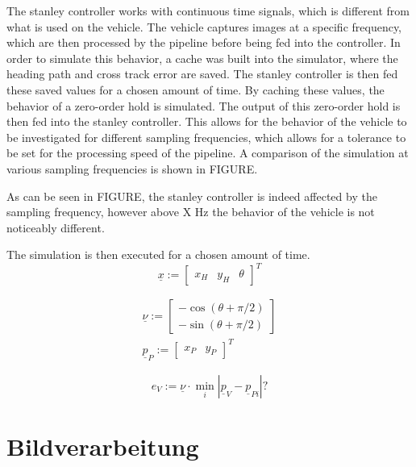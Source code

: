 \documentclass[arbeit=studie,oneside,BCOR=12mm]{ArbeitRST}
\begin{document}
The stanley controller works with continuous time signals, which is different
from what is used on the vehicle. The vehicle captures images at a specific
frequency, which are then processed by the pipeline before being fed into the
controller. In order to simulate this behavior, a cache was built into the
simulator, where the heading path and cross track error are saved. The stanley
controller is then fed these saved values for a chosen amount of time. By
caching these values, the behavior of a zero-order hold is simulated. The
output of this zero-order hold is then fed into the stanley controller. This
allows for the behavior of the vehicle to be investigated for different
sampling frequencies, which allows for a tolerance to be set for the processing
speed of the pipeline. A comparison of the simulation at various sampling
frequencies is shown in FIGURE.

As can be seen in FIGURE, the stanley controller is indeed affected by the
sampling frequency, however above X Hz the behavior of the vehicle is not
noticeably different. 

The simulation is then executed for a chosen amount of time. 
    \begin{equation} 
        \underline{x} := 
        \begin{bmatrix}
            x_H & y_H & \theta
        \end{bmatrix}^T 
        \label{Zustandsvektor}
    \end{equation}




    \begin{gather}
        \underline{\nu} := 
        \begin{bmatrix}
            -\cos(\theta + \pi/2) \\
            -\sin(\theta + \pi/2)
        \end{bmatrix} \\
        \underline{p}_P := 
        \begin{bmatrix}
            x_P & y_P
        \end{bmatrix}^T
    \end{gather}

    \begin{equation}
        e_V :=  \underline{\nu} \cdot \min_i |\underline{p}_V -  \underline{p}_{Pi}| ?
        \label{eq:Querabweichung}
    \end{equation}

\chapter{Bildverarbeitung}
\end{document}
